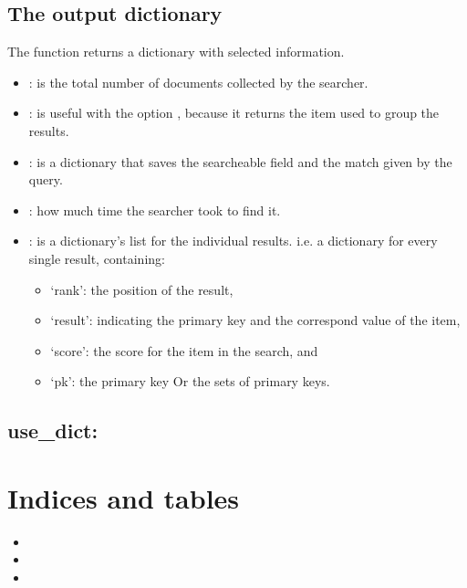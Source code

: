 \documentclass[letterpaper,10pt,english]{sphinxmanual}
\begin{document}
\section{The output dictionary}
\label{Introduction:the-output-dictionary}
The  function returns a dictionary with selected information.
\begin{itemize}
\item {} 
: is the total number of documents collected by the searcher.

\item {} 
: is useful with the option , because it returns the item used to group the results.

\item {} 
: is a dictionary that saves the searcheable field and the match given by the query.

\item {} 
: how much time the searcher took to find it.

\item {} 
: is  a dictionary's list for the individual results. i.e. a dictionary for every single result, containing:
\begin{itemize}
\item {} 
`rank': the position of the result,

\item {} 
`result': indicating the primary key and the correspond value of the item,

\item {} 
`score': the score for the item in the search, and

\item {} 
`pk': the primary key Or the sets of primary keys.

\end{itemize}

\end{itemize}


\section{use\_dict:}
\label{Introduction:use-dict}

\chapter{Indices and tables}
\label{index:indices-and-tables}\begin{itemize}
\item {} 

\item {} 

\item {} 

\end{itemize}



\renewcommand{\indexname}{Index}
\printindex
\end{document}
